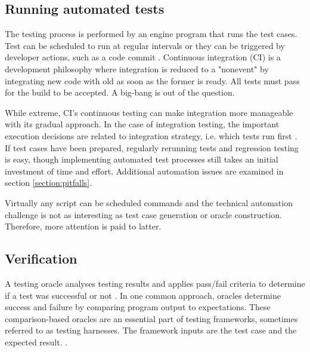 \documentclass[12pt,a4paper,oneside,pdftex]{report}
\begin{document}
{\subsection{Running automated tests}

The testing process is performed by an engine program that runs the test cases. Test can be scheduled to run at regular intervals or they can be triggered by developer actions, such as a code commit \citep{pezze2008software}. Continuous integration (CI) is a development philosophy where integration is reduced to a "nonevent" by integrating new code with old as soon as the former is ready. All tests must pass for the build to be accepted. \citep{duvall2007continuous} A big-bang is out of the question. 

While extreme, CI's continuous testing can make integration more manageable with its gradual approach. In the case of integration testing, the important execution decisions are related to integration strategy, i.e. which tests run first \citep{duvall2007continuous}. If test cases have been prepared, regularly rerunning tests and regression testing is easy, though implementing automated test processes still takes an initial investment of time and effort. Additional automation issues are examined in section \ref{section:pitfalls}. %

Virtually any script can be scheduled commands and the technical automation challenge is not as interesting as test case generation or oracle construction. Therefore, more attention is paid to latter.


\subsection{Verification}

A testing oracle analyses testing results and applies pass/fail criteria to determine if a test was successful or not \citep{pezze2008software, burnstein2003practical}. In one common approach, oracles determine success and failure by comparing program output to expectations. These comparison-based oracles are an essential part of testing frameworks, sometimes referred to as testing harnesses. The framework inputs are the test case and the expected result. \citep{pezze2008software}. 

}
\end{document}
